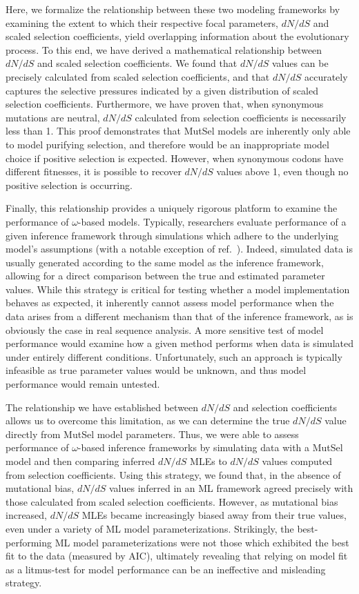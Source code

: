 \documentclass[11pt]{article}
\begin{document}
Here, we formalize the relationship between these two modeling frameworks by examining the extent to which their respective focal parameters, $dN/dS$ and scaled selection coefficients, yield overlapping information about the evolutionary process. To this end, we have derived a mathematical relationship between $dN/dS$ and scaled selection coefficients. We found that $dN/dS$ values can be precisely calculated from scaled selection coefficients, and that $dN/dS$ accurately captures the selective pressures indicated by a given distribution of scaled selection coefficients. Furthermore, we have proven that, when synonymous mutations are neutral, $dN/dS$ calculated from selection coefficients is necessarily less than 1. This proof demonstrates that MutSel models are inherently only able to model purifying selection, and therefore would be an inappropriate model choice if positive selection is expected. However, when synonymous codons have different fitnesses, it is possible to recover $dN/dS$ values above 1, even though no positive selection is occurring. 

Finally, this relationship provides a uniquely rigorous platform to examine the performance of $\omega$-based models. Typically, researchers evaluate performance of a given inference framework through simulations which adhere to the underlying model's assumptions (with a notable exception of ref.\ \cite{Holder2008}). Indeed, simulated data is usually generated according to the same model as the inference framework, allowing for a direct comparison between the true and estimated parameter values. While this strategy is critical for testing whether a model implementation behaves as expected, it inherently cannot assess model performance when the data arises from a different mechanism than that of the inference framework, as is obviously the case in real sequence analysis. A more sensitive test of model performance would examine how a given method performs when data is simulated under entirely different conditions. Unfortunately, such an approach is typically infeasible as true parameter values would be unknown, and thus model performance would remain untested. 

The relationship we have established between $dN/dS$ and selection coefficients allows us to overcome this limitation, as we can determine the true $dN/dS$ value directly from MutSel model parameters. Thus, we were able to assess performance of $\omega$-based inference frameworks by simulating data with a MutSel model and then comparing inferred $dN/dS$ MLEs to $dN/dS$ values computed from selection coefficients. Using this strategy, we found that, in the absence of mutational bias, $dN/dS$ values inferred in an ML framework agreed precisely with those calculated from scaled selection coefficients. However, as mutational bias increased, $dN/dS$ MLEs became increasingly biased away from their true values, even under a variety of ML model parameterizations. Strikingly, the best-performing ML model parameterizations were not those which exhibited the best fit to the data (measured by AIC), ultimately revealing that relying on model fit as a litmus-test for model performance can be an ineffective and misleading strategy. 
\end{document}
